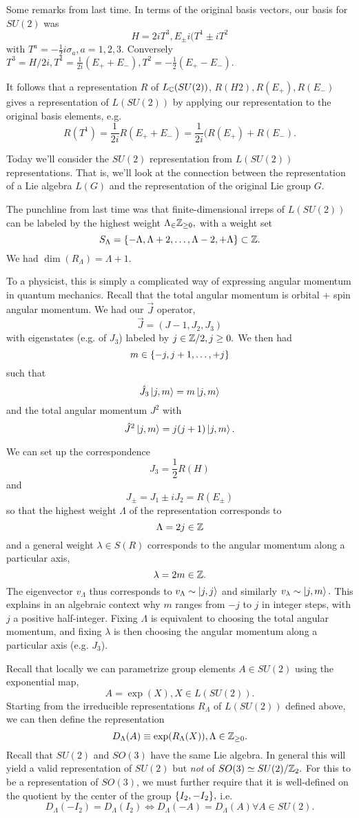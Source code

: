 Some remarks from last time. In terms of the original basis vectors, our basis for $SU(2)$ was
$$H=2i T^3, E_\pm i(T^1 \pm i T^2$$
with $T^a=-\frac{1}{2}i \sigma_a, a=1,2,3.$ Conversely $T^3=H/2i, T^1=\frac{1}{2i}(E_+ + E_-), T^2= -\frac{1}{2}(E_+-E_-).$

It follows that a representation $R$ of $L_{\mathbb{C}}(SU(2))$, $R(H2),R(E_+),R(E_-)$ gives a representation of $L(SU(2))$ by applying our representation to the original basis elements, e.g.
$$R(T^1)=\frac{1}{2i} R(E_++ E_-)=\frac{1}{2i}(R(E_+)+R(E_-).$$

Today we'll consider the $SU(2)$ representation from $L(SU(2))$ representations. That is, we'll look at the connection between the representation of a Lie algebra $L(G)$ and the representation of the original Lie group $G$.

The punchline from last time was that finite-dimensional irreps of $L(SU(2))$ can be labeled by the highest weight $\Lambda_\in \mathbb{Z}_{\geq 0},$ with a weight set
$$S_\Lambda=\{-\Lambda, \Lambda+2,\ldots, \Lambda-2, +\Lambda\}\subset \mathbb{Z}.$$
We had $\dim(R_\Lambda)=\Lambda+1$.

To a physicist, this is simply a complicated way of expressing angular momentum in quantum mechanics. Recall that the total angular momentum is orbital $+$ spin angular momentum. We had our $\vec J$ operator,
$$\vec J=(J-1,J_2,J_3)$$ with eigenstates (e.g. of $J_3$) labeled by $j\in \mathbb{Z}/2, j\geq 0.$ We then had
$$m\in \{-j,j+1,\ldots,+j\}$$
such that
$$\hat J_3\left| j,m \right>=m\left| j,m \right>$$
and the total angular momentum $J^2$ with
$$\hat J^2 \left| j,m \right>=j(j+1)\left| j,m \right>.$$

We can set up the correspondence
$$J_3=\frac{1}{2}R(H)$$
and
$$J_\pm = J_1\pm i J_2 = R(E_\pm)$$
so that the highest weight $\Lambda$ of the representation corresponds to 
$$\Lambda = 2j \in \mathbb{Z}$$ and a general weight $\lambda \in S(R)$ corresponds to the angular momentum along a particular axis,
$$\lambda = 2m\in \mathbb{Z}.$$
The eigenvector $v_\Lambda$ thus corresponds to
$v_\Lambda \sim \left| j,j \right>$ and similarly $v_\lambda \sim \left| j,m \right>.$
This explains in an algebraic context why $m$ ranges from $-j$ to $j$ in integer steps, with $j$ a positive half-integer. Fixing $\Lambda$ is equivalent to choosing the total angular momentum, and fixing $\lambda$ is then choosing the angular momentum along a particular axis (e.g. $J_3$).

Recall that locally we can parametrize group elements $A\in SU(2)$ using the exponential map,
$$A=\exp(X), X\in L(SU(2)).$$
Starting from the irreducible representations $R_\Lambda$ of $L(SU(2))$ defined above, we can then define the representation
$$D_\Lambda(A)\equiv \exp (R_\Lambda(X)), \Lambda \in \mathbb{Z}_{\geq 0}.$$
Recall that $SU(2)$ and $SO(3)$ have the same Lie algebra. In general this will yield a valid representation of $SU(2)$ but \emph{not} of $SO(3)\simeq SU(2)/\mathbb{Z}_2.$ For this to be a representation of $SO(3)$, we must further require that it is well-defined on the quotient by the center of the group $\{I_2,-I_2\},$ i.e.
$$D_\Lambda(-I_2)=D_\Lambda(I_2) \iff D_\Lambda(-A)=D_\Lambda(A) \forall A\in SU(2).$$


